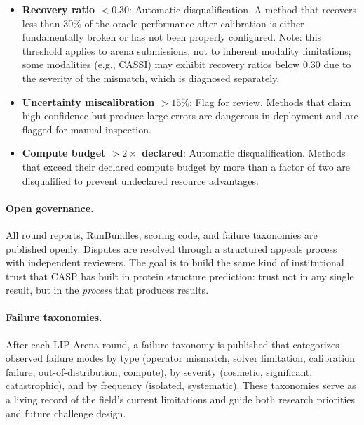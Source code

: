 \begin{itemize}
  \item \textbf{Recovery ratio $< 0.30$}: Automatic disqualification.
        A method that recovers less than 30\% of the oracle performance
        after calibration is either fundamentally broken or has not
        been properly configured.  Note: this threshold applies to
        arena submissions, not to inherent modality limitations; some
        modalities (e.g., CASSI) may exhibit recovery ratios below 0.30
        due to the severity of the mismatch, which is diagnosed separately.
  \item \textbf{Uncertainty miscalibration $> 15\%$}: Flag for review.
        Methods that claim high confidence but produce large errors
        are dangerous in deployment and are flagged for manual
        inspection.
  \item \textbf{Compute budget $> 2\times$ declared}: Automatic
        disqualification.
        Methods that exceed their declared compute budget by more than
        a factor of two are disqualified to prevent undeclared
        resource advantages.
\end{itemize}

\paragraph{Open governance.}
All round reports, RunBundles, scoring code, and failure taxonomies
are published openly.
Disputes are resolved through a structured appeals process with
independent reviewers.
The goal is to build the same kind of institutional trust that CASP
has built in protein structure prediction: trust not in any single
result, but in the \emph{process} that produces results.

\paragraph{Failure taxonomies.}
After each LIP-Arena round, a failure taxonomy is published that
categorizes observed failure modes by type (operator mismatch, solver
limitation, calibration failure, out-of-distribution, compute), by
severity (cosmetic, significant, catastrophic), and by frequency
(isolated, systematic).
These taxonomies serve as a living record of the field's current
limitations and guide both research priorities and future challenge
design.
